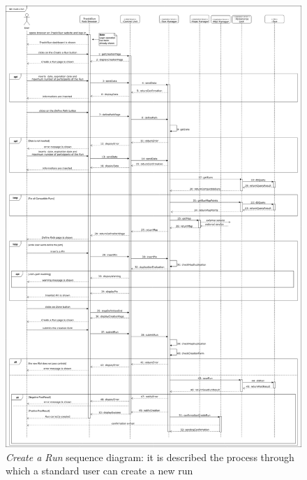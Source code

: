 \begin{figure}[H]
  \begin{center}
  	\includegraphics[height=.6\paperheight]{./img/sequence/createRun.png}
    \hspace{0.05\linewidth}
    \centering
    \caption{\textit{Create a Run} sequence diagram: it is described the process through which a standard user can create a new run}
		\label{img:createRun}
    \end{center}
\end{figure}

